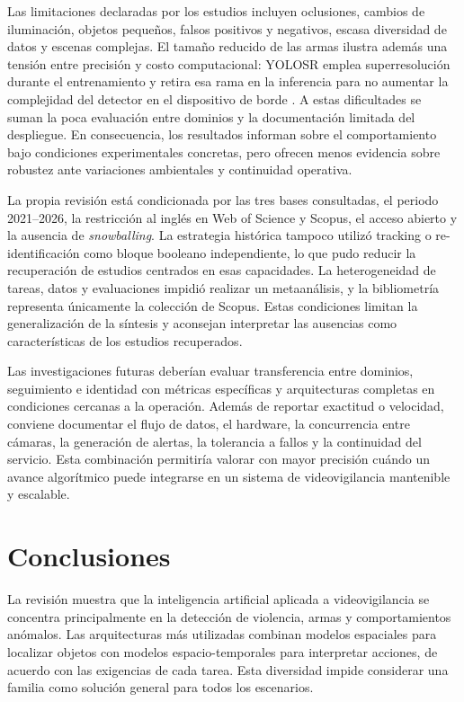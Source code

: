 \documentclass[pdflatex,sn-mathphys-num]{sn-jnl}%
\theoremstyle{thmstyleone}%
\theoremstyle{thmstyletwo}%
\theoremstyle{thmstylethree}%
\begin{document}
Las limitaciones declaradas por los estudios incluyen oclusiones, cambios de iluminación, objetos pequeños, falsos positivos y negativos, escasa diversidad de datos y escenas complejas. El tamaño reducido de las armas ilustra además una tensión entre precisión y costo computacional: YOLOSR emplea superresolución durante el entrenamiento y retira esa rama en la inferencia para no aumentar la complejidad del detector en el dispositivo de borde \cite{berardini2025}. A estas dificultades se suman la poca evaluación entre dominios y la documentación limitada del despliegue. En consecuencia, los resultados informan sobre el comportamiento bajo condiciones experimentales concretas, pero ofrecen menos evidencia sobre robustez ante variaciones ambientales y continuidad operativa.

La propia revisión está condicionada por las tres bases consultadas, el periodo 2021--2026, la restricción al inglés en Web of Science y Scopus, el acceso abierto y la ausencia de \textit{snowballing}. La estrategia histórica tampoco utilizó tracking o re-identificación como bloque booleano independiente, lo que pudo reducir la recuperación de estudios centrados en esas capacidades. La heterogeneidad de tareas, datos y evaluaciones impidió realizar un metaanálisis, y la bibliometría representa únicamente la colección de Scopus. Estas condiciones limitan la generalización de la síntesis y aconsejan interpretar las ausencias como características de los estudios recuperados.

Las investigaciones futuras deberían evaluar transferencia entre dominios, seguimiento e identidad con métricas específicas y arquitecturas completas en condiciones cercanas a la operación. Además de reportar exactitud o velocidad, conviene documentar el flujo de datos, el hardware, la concurrencia entre cámaras, la generación de alertas, la tolerancia a fallos y la continuidad del servicio. Esta combinación permitiría valorar con mayor precisión cuándo un avance algorítmico puede integrarse en un sistema de videovigilancia mantenible y escalable.

\section{Conclusiones}\label{sec13}

La revisión muestra que la inteligencia artificial aplicada a videovigilancia se concentra principalmente en la detección de violencia, armas y comportamientos anómalos. Las arquitecturas más utilizadas combinan modelos espaciales para localizar objetos con modelos espacio-temporales para interpretar acciones, de acuerdo con las exigencias de cada tarea. Esta diversidad impide considerar una familia como solución general para todos los escenarios.
\end{document}
